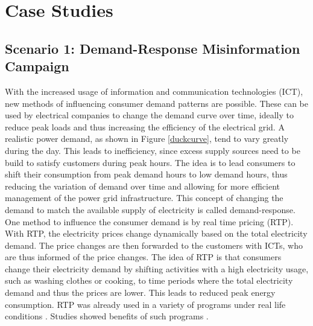 \chapter{Case Studies}

\section{Scenario 1: Demand-Response Misinformation Campaign}
\label{demandresponsesection}

With the increased usage of information and communication 
technologies (ICT), new methods of influencing
consumer demand patterns are possible. 
These can be used by electrical companies to change the 
demand curve over time, ideally to reduce peak loads 
and thus increasing the efficiency of the electrical grid.
A realistic power demand, as shown in Figure \ref{duckcurve}, tend 
to vary greatly during the day. This leads to inefficiency,
since excess supply sources need to be build to satisfy customers
during peak hours. The idea is to lead consumers to shift
their consumption from peak demand hours to low demand hours,
thus reducing the variation of demand over time and allowing
for more efficient management of the power grid infrastructure.
This concept of changing the demand to match the 
available supply of electricity is called demand-response. 
One method to influence the consumer demand is by real time 
pricing (RTP). With RTP, the electricity prices change
dynamically based on the total electricity demand.
The price changes are then forwarded to the customers with ICTs, 
who are thus informed of the price changes.
The idea of RTP is that consumers change their electricity demand
by shifting activities with a high electricity usage, 
such as washing clothes or cooking, to time periods 
where the total electricity demand and thus the prices
are lower. This leads to reduced peak energy consumption. 
RTP was already used in a variety of programs
under real life conditions \cite{barbose2004survey}.
Studies showed benefits of such programs \cite{albadi2008summary}.


